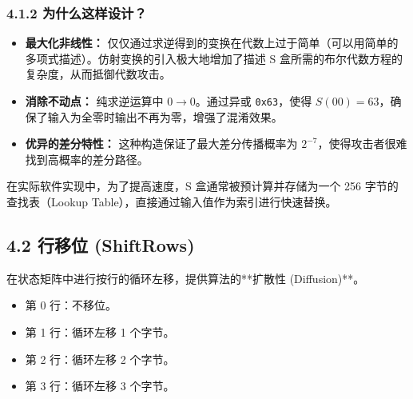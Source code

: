 \documentclass[12pt, a4paper]{article}
\begin{document}
\subsubsection{4.1.2 为什么这样设计？}

\begin{itemize}
    \item \textbf{最大化非线性：} 仅仅通过求逆得到的变换在代数上过于简单（可以用简单的多项式描述）。仿射变换的引入极大地增加了描述 S 盒所需的布尔代数方程的复杂度，从而抵御代数攻击。
    \item \textbf{消除不动点：} 纯求逆运算中 $0 \to 0$。通过异或 \texttt{0x63}，使得 $S(00) = 63$，确保了输入为全零时输出不再为零，增强了混淆效果。
    \item \textbf{优异的差分特性：} 这种构造保证了最大差分传播概率为 $2^{-7}$，使得攻击者很难找到高概率的差分路径。
\end{itemize}

\begin{tcolorbox}[notebox=小贴士]
在实际软件实现中，为了提高速度，S 盒通常被预计算并存储为一个 256 字节的查找表（Lookup Table），直接通过输入值作为索引进行快速替换。
\end{tcolorbox}
\subsection{4.2 行移位 (ShiftRows)}
在状态矩阵中进行按行的循环左移，提供算法的**扩散性 (Diffusion)**。
\begin{itemize}
    \item 第 0 行：不移位。
    \item 第 1 行：循环左移 1 个字节。
    \item 第 2 行：循环左移 2 个字节。
    \item 第 3 行：循环左移 3 个字节。
\end{itemize}
\end{document}
